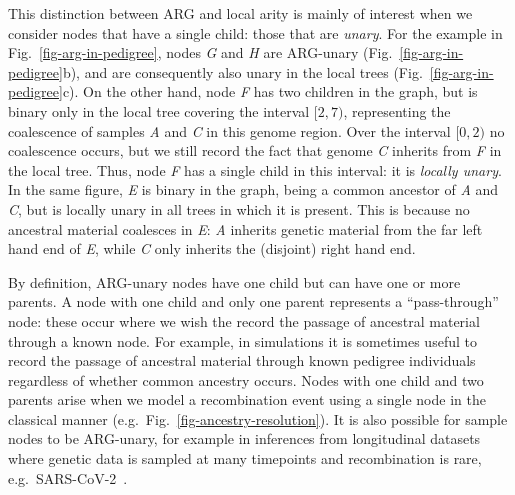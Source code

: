 \documentclass[9pt,twocolumn,twoside]{gsajnl}
\newcommand{\noderef}[1]{\textit{#1}}
\begin{document}
This distinction between ARG and local arity is mainly
of interest when we consider nodes that have
a single child: those that are \emph{unary}.
For the example in Fig.~\ref{fig-arg-in-pedigree}, nodes
\noderef{G} and \noderef{H}
are ARG-unary (Fig.~\ref{fig-arg-in-pedigree}b), and are consequently
also unary in the local trees (Fig.~\ref{fig-arg-in-pedigree}c).
On the other hand, node \noderef{F} has two children
in the graph, but is binary only
in the local tree covering the interval $[2, 7)$,
representing the coalescence of samples \noderef{A} and \noderef{C}
in this genome region. Over the interval $[0, 2)$ no coalescence occurs,
but we still record the fact that genome \noderef{C} inherits from \noderef{F}
in the local tree. Thus, node \noderef{F} has a single child in this
interval: it is \emph{locally unary}.
In the same figure, \noderef{E} is binary in the graph, being a common
ancestor of \noderef{A} and \noderef{C}, but is
locally unary in all trees in which it is present.
This is because no ancestral material coalesces in \noderef{E}:
\noderef{A} inherits genetic material from the far left hand end of
\noderef{E},
while \noderef{C} only inherits the (disjoint) right hand end.

By definition, ARG-unary nodes have one child but can have one or
more parents.
A node with one child and only one parent represents a ``pass-through'' node:
these occur where we wish the record the passage of ancestral material
through a known node. For example, in simulations
it is sometimes useful to record the passage of
ancestral material through known pedigree individuals
regardless of whether common ancestry occurs.
Nodes with one child and two parents arise when
we model a recombination event using a single node
in the classical manner
(e.g.\ Fig.~\ref{fig-ancestry-resolution}).
It is also possible for sample nodes to be ARG-unary, for example
in inferences from longitudinal datasets where genetic
data is sampled at many timepoints and recombination
is rare, e.g.~SARS-CoV-2~\citep{zhan2023towards}.
\end{document}

